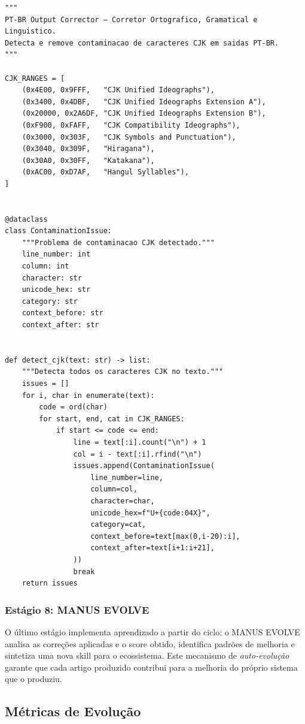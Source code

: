 \begin{lstlisting}[caption={ptbr\_corrector.py — Deteccao CJK e Gramatica PT-BR},
label={lst:ptbr-corrector}, style=pythonstyle]
"""
PT-BR Output Corrector — Corretor Ortografico, Gramatical e Linguistico.
Detecta e remove contaminacao de caracteres CJK em saidas PT-BR.
"""

CJK_RANGES = [
    (0x4E00, 0x9FFF,   "CJK Unified Ideographs"),
    (0x3400, 0x4DBF,   "CJK Unified Ideographs Extension A"),
    (0x20000, 0x2A6DF, "CJK Unified Ideographs Extension B"),
    (0xF900, 0xFAFF,   "CJK Compatibility Ideographs"),
    (0x3000, 0x303F,   "CJK Symbols and Punctuation"),
    (0x3040, 0x309F,   "Hiragana"),
    (0x30A0, 0x30FF,   "Katakana"),
    (0xAC00, 0xD7AF,   "Hangul Syllables"),
]


@dataclass
class ContaminationIssue:
    """Problema de contaminacao CJK detectado."""
    line_number: int
    column: int
    character: str
    unicode_hex: str
    category: str
    context_before: str
    context_after: str


def detect_cjk(text: str) -> list:
    """Detecta todos os caracteres CJK no texto."""
    issues = []
    for i, char in enumerate(text):
        code = ord(char)
        for start, end, cat in CJK_RANGES:
            if start <= code <= end:
                line = text[:i].count("\n") + 1
                col = i - text[:i].rfind("\n")
                issues.append(ContaminationIssue(
                    line_number=line,
                    column=col,
                    character=char,
                    unicode_hex=f"U+{code:04X}",
                    category=cat,
                    context_before=text[max(0,i-20):i],
                    context_after=text[i+1:i+21],
                ))
                break
    return issues
\end{lstlisting}

\subsubsection{Estágio 8: MANUS EVOLVE}

O último estágio implementa aprendizado a partir do ciclo:
o MANUS EVOLVE analisa as correções aplicadas e o score obtido,
identifica padrões de melhoria e sintetiza uma nova skill para o
ecossistema. Este mecanismo de \textit{auto-evolução} garante que
cada artigo produzido contribui para a melhoria do próprio sistema
que o produziu.

\subsection{Métricas de Evolução}

